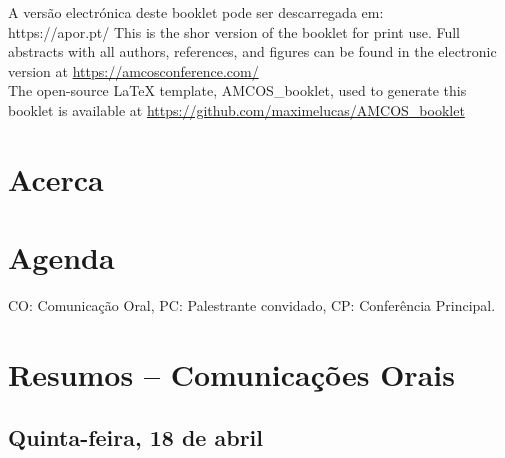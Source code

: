 \documentclass[openany, parskip=full, 12pt, a4]{scrbook}
\begin{document}
	
	
\mbox{}
\thispagestyle{empty}
\vfill
\begin{center}
	\ifOnline
	A versão electrónica deste booklet pode ser descarregada em: \\
	https://apor.pt/
	\else
	This is the shor version of the booklet for print use. Full abstracts with all authors, references, and figures can be found in the electronic version at \url{https://amcosconference.com/}
	\fi %
	\\[20pt] %
	The open-source \LaTeX{} template, AMCOS\_booklet, used to generate this booklet is available at \url{https://github.com/maximelucas/AMCOS\_booklet}
\end{center}

\newpage

\tableofcontents

\chapter{Acerca}



\chapter{Agenda}

CO: Comunicação Oral, PC: Palestrante convidado, CP: Conferência Principal.


\chapter{Resumos -- Comunicações Orais}

\section{Quinta-feira, 18 de abril}
\end{document}
